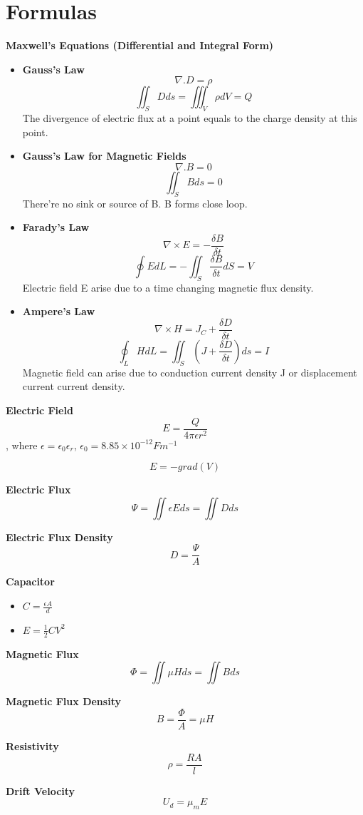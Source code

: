\documentclass{article}
\begin{document}
\Large
  \section{Formulas}
  \textbf{Maxwell's Equations (Differential and Integral Form)}
\begin{itemize}
\item \textbf{Gauss's Law}  $$ \nabla .D = \rho $$ $$ \iint_SDds = \iiint_V\rho dV = Q $$
The divergence of electric flux at a point equals to the charge density at this point.
\item \textbf{Gauss's Law for Magnetic Fields}   $$\nabla .B = 0$$ $$ \iint_S Bds = 0 $$
There're no sink or source of B. B forms close loop.
\item  \textbf{Farady's Law}  $$\nabla \times E = -\frac{\delta B}{\delta t}$$ $$ \oint EdL = -\iint_S \frac{\delta B}{\delta t}dS = V $$
Electric field E arise due to a time changing magnetic flux density.
\item  \textbf{Ampere's Law}  $$\nabla \times H = J_C + \frac{\delta D}{\delta t}$$
$$ \oint_L HdL = \iint_S(J + \frac{\delta D}{\delta t})ds = I $$
Magnetic field can arise due to conduction current density J or displacement current current density.
\end{itemize}
  \textbf{Electric Field}
  $$E = \frac{Q}{4\pi \epsilon r^2}$$, where $\epsilon = \epsilon_0 \epsilon_r$, $\epsilon_0 = 8.85 \times 10^{-12}Fm^{-1}$
  
  $$E = -grad(V)$$
  
  \textbf{Electric Flux}
  $$\Psi = \iint\epsilon E ds = \iint Dds $$
  
  
  \textbf{Electric Flux Density}
  $$D = \frac{\Psi}{A}$$

  \textbf{Capacitor}
  \begin{itemize}
  \item $ C = \frac{\epsilon A}{d}$
  \item $E = \frac{1}{2}CV^2$
  \end{itemize}      
  
  \textbf{Magnetic Flux}
  $$ \Phi = \iint \mu Hds = \iint Bds $$
  
  \textbf{Magnetic Flux Density}
  $$B = \frac{\Phi}{A} = \mu H$$
  
  
  \textbf{Resistivity}
  $$\rho = \frac{RA}{l}$$
  
  \textbf{Drift Velocity}
  $$U_d = \mu_m E$$
  
\end{document}
